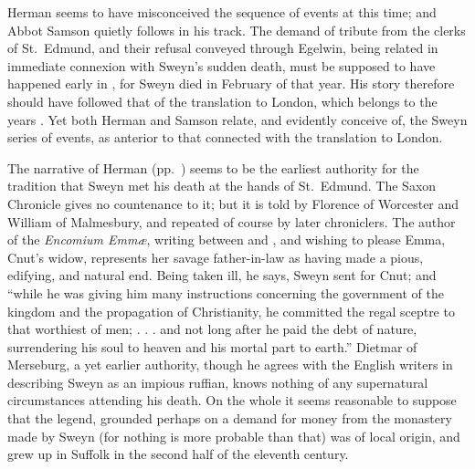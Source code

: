\documentclass[10pt]{book}
\begin{document}
{Herman seems to have misconceived the sequence of events at this time; and Abbot Samson quietly follows in his track. The demand of tribute from the clerks of St.\ Edmund, and their refusal conveyed through Egelwin, being related in immediate connexion with Sweyn's sudden death, must be supposed to have happened early in , for Sweyn died in February of that year. His story therefore should have followed that of the translation to London, which belongs to the years . Yet both Herman and Samson relate, and evidently conceive of, the Sweyn series of events, as anterior to that connected with the translation to London.

The narrative of Herman (pp.\ ) seems to be the earliest authority for the tradition that Sweyn met his death at the hands of St.\ Edmund. The Saxon Chronicle gives no countenance to it; but it is told by Florence of Worcester and William of Malmesbury, and repeated of course by later chroniclers. The author of the \emph{Encomium Emm\ae{}}, writing between  and , and wishing to please Emma, Cnut's widow, represents her savage father-in-law as having made a pious, edifying, and natural end. Being taken ill, he says, Sweyn sent for Cnut; and ``while he was giving him many instructions concerning the government of the kingdom and the propagation of Christianity, he committed the regal sceptre to that worthiest of men; . . . and not long after he paid the debt of nature, surrendering his soul to heaven and his mortal part to earth.'' Dietmar of Merseburg, a yet earlier authority, though he agrees with the English writers in describing Sweyn as an impious ruffian, knows nothing of any supernatural circumstances attending his death. On the whole it seems reasonable to suppose that the legend, grounded perhaps on a demand for money from the monastery made by Sweyn (for nothing is more probable than that) was of local origin, and grew up in Suffolk in the second half of the eleventh century.

}
\end{document}
